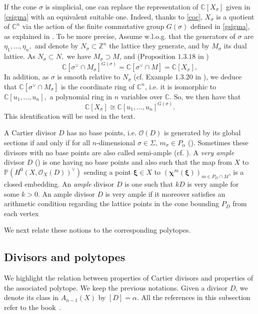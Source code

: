 \documentclass[a4paper,11pt]{amsart}
\newcommand{\C}{\mathbb{C}}
\renewcommand{\P}{\mathbb{P}}
\newcommand{\Z}{\mathbb{Z}}
\newcommand{\cO}{{\mathcal O}}
\newcommand{\bfxi}{{\boldsymbol{\xi}}}
\newcommand{\bfchi}{{\boldsymbol{\chi}}}
\newcounter{thm}
\numberwithin{thm}{section}
\numberwithin{equation}{section}
\theoremstyle{definition}
\theoremstyle{plain}
\begin{document}
If the cone $\sigma$ is simplicial, one can replace the representation of $\C[X_\sigma]$ given in  \eqref{csigma} with an equivalent suitable one. Indeed, thanks to \eqref{coc}, $X_\sigma$ is a quotient of $\C^n$ via the action of the finite commutative group $G(\sigma)$ defined in \eqref{gsigma}, as explained in \cite[Example 1.3.20]{CLS11}. To be more precise, Assume w.l.o.g. that the generators of $\sigma$ are $\eta_1,\ldots, \eta_n,$  and denote by $N_\sigma\subset\Z^n$ the lattice they generate, and by $M_\sigma$ its dual lattice.  As $N_\sigma\subset N,$ we  have $M_\sigma\supset M$, and (Proposition $1.3.18$ in \cite{CLS11})
\begin{equation}\label{rev}
 \C[\sigma^\vee\cap M_\sigma]^{G(\sigma)}=\C[\sigma^\vee\cap M]=\C[X_\sigma],
\end{equation}
In addition, as $\sigma$ is smooth relative to $N_\sigma$ (cf. Example $1.3.20$ in \cite{CLS11}), we deduce that $\C[\sigma^\vee\cap M_\sigma]$ is the coordinate ring of $\C^n$, i.e. it is isomorphic to $\C[u_1,\ldots, u_n],$ a polynomial ring in $n$ variables over $\C.$ So, we then have that 
\begin{equation}\label{zimp}
\C[X_\sigma]\cong \C[u_1,\ldots, u_n]^{G(\sigma)}.
\end{equation}
This identification will be used in the text.

A Cartier  divisor $D$  has no base points, i.e. $\cO(D)$ is generated by its global sections if and only if for all $n$-dimensional $\sigma\in\Sigma,\, m_\sigma\in P_\alpha$
(\cite[Proposition 6.11]{CLS11}).
Sometimes these divisors with no base points are also called semi-ample (cf. \cite{KS05}).
A {\em very ample} divisor $D$ (\cite[Definition 6.1.9]{CLS11}) is one having no base points and also such that the map from $X$ to  $\P(H^0(X,\cO_X(D))^\vee)$ sending a point $\bfxi \in X$ to $(\bfchi^m(\bfxi))_{m\in P_D\cap M}$,
is a closed embedding.
An {\em ample} divisor $D$ is one such that $k D$ is very ample for some $k>0.$   An ample divisor $D$ is very ample if it moreover  satisfies an arithmetic condition regarding the lattice points in the cone bounding $P_D$ from each vertex 

We next relate these notions to the corresponding polytopes.


\subsection{Divisors and polytopes} \label{ssec:divpol}
We highlight the relation between properties of Cartier divisors and properties of the associated polytope. We keep the previous notations. Given a divisor $D$, we denote its class in $A_{n-1}(X)$ by $[D]= \alpha$. All the references in this subsection refer to the book~\cite{CLS11}.
\end{document}
